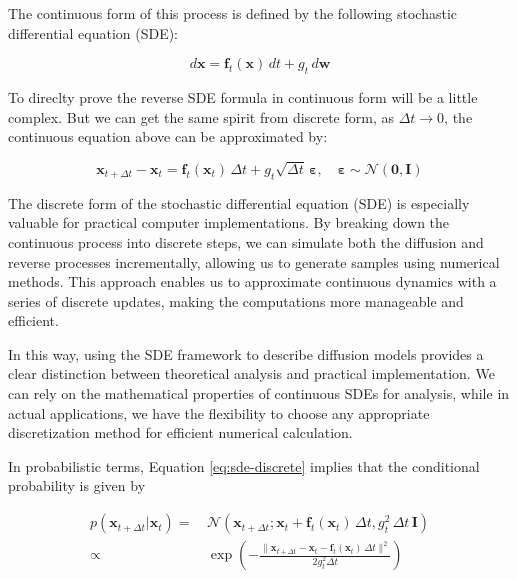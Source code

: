 The continuous form of this process is defined by the following stochastic differential equation (SDE):

\begin{equation}
d\mathbf{x} = \mathbf{f}_t(\mathbf{x}) \, dt + g_t \, d\mathbf{w} \label{eq:sde-forward}
\end{equation}

To direclty prove the reverse SDE formula in continuous form will be a little complex. But we can get the same spirit from discrete form, as \( \Delta t \to 0 \), the continuous equation above can be approximated by:

\begin{equation}
\mathbf{x}_{t+\Delta t} - \mathbf{x}_t = \mathbf{f}_t(\mathbf{x}_t) \, \Delta t + g_t \sqrt{\Delta t} \, \mathbf{\varepsilon}, \quad \mathbf{\varepsilon} \sim \mathcal{N}(\mathbf{0}, \mathbf{I}) \label{eq:sde-discrete}
\end{equation}

The discrete form of the stochastic differential equation (SDE) is especially valuable for practical computer implementations. By breaking down the continuous process into discrete steps, we can simulate both the diffusion and reverse processes incrementally, allowing us to generate samples using numerical methods. This approach enables us to approximate continuous dynamics with a series of discrete updates, making the computations more manageable and efficient.

In this way, using the SDE framework to describe diffusion models provides a clear distinction between theoretical analysis and practical implementation. We can rely on the mathematical properties of continuous SDEs for analysis, while in actual applications, we have the flexibility to choose any appropriate discretization method for efficient numerical calculation.

In probabilistic terms, Equation \eqref{eq:sde-discrete} implies that the conditional probability is given by

\begin{equation}
\begin{aligned}
p(\mathbf{x}_{t+\Delta t}|\mathbf{x}_t) =&\, \mathcal{N}\left(\mathbf{x}_{t+\Delta t}; \mathbf{x}_t + \mathbf{f}_t(\mathbf{x}_t) \, \Delta t, g_t^2 \, \Delta t \, \mathbf{I}\right) \\
\propto&\, \exp\left(-\frac{\|\mathbf{x}_{t+\Delta t} - \mathbf{x}_t - \mathbf{f}_t(\mathbf{x}_t) \, \Delta t\|^2}{2 g_t^2 \Delta t}\right)
\end{aligned} \label{eq:sde-proba}
\end{equation}

